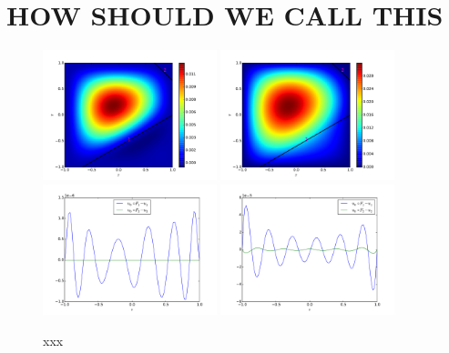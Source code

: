 \documentclass{marine_2015}
\begin{document}
\section{HOW SHOULD WE CALL THIS}
\label{sec:lbb}



 \begin{figure}[ht]
 \centering
 \includegraphics[width=0.45\textwidth]{img/shen_u0}
 \includegraphics[width=0.45\textwidth]{img/sine_u0}\\
 \includegraphics[width=0.45\textwidth]{img/shen_u0_ur}
 \includegraphics[width=0.45\textwidth]{img/sine_u0_ur}\\
 \caption{xxx
 }
 \label{fig:conds}
 \end{figure}
\end{document}
